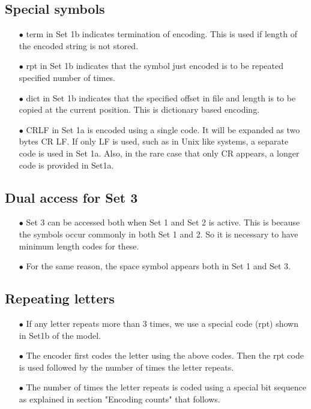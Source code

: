 \documentclass[]{article}
\begin{document}
\subsection{Special symbols}
\begin{itemize}
	\item[$\bullet$] term in Set 1b indicates termination of encoding.  This is used if length of the encoded string is not stored.
	\item[$\bullet$] rpt in Set 1b indicates that the symbol just encoded is to be repeated specified number of times.
	\item[$\bullet$] dict in Set 1b indicates that the specified offset in file and length is to be copied at the current position. This is dictionary based encoding.
	\item[$\bullet$] CRLF in Set 1a is encoded using a single code. It will be expanded as two bytes CR LF.  If only LF is used, such as in Unix like systems, a separate code is used in Set 1a.  Also, in the rare case that only CR appears, a longer code is provided in Set1a.
\end{itemize}

\subsection{Dual access for Set 3}
\begin{itemize}
	\item[$\bullet$] Set 3 can be accessed both when Set 1 and Set 2 is active.  This is because the symbols occur commonly in both Set 1 and 2.  So it is necessary to have minimum length codes for these.
	\item[$\bullet$] For the same reason, the space symbol appears both in Set 1 and Set 3.
\end{itemize}

\subsection{Repeating letters}
\begin{itemize}
	\item[$\bullet$] If any letter repeats more than 3 times, we use a special code (rpt) shown in Set1b of the model.
	\item[$\bullet$] The encoder first codes the letter using the above codes.  Then the rpt code is used followed by the number of times the letter repeats.
	\item[$\bullet$] The number of times the letter repeats is coded using a special bit sequence as explained in section "Encoding counts" that follows.
\end{itemize}
\end{document}
